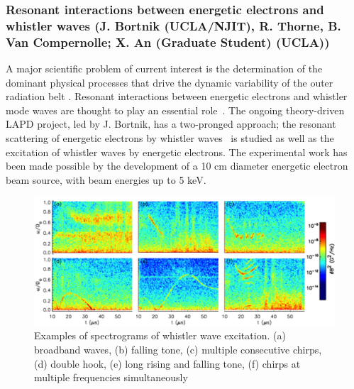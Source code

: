 \documentclass[11pt]{article}
\renewcommand{\cite}{\citep}
\begin{document}
\subsubsection{Resonant interactions between energetic electrons and whistler
waves (J. Bortnik (UCLA/NJIT), R. Thorne, B. Van Compernolle; X. An (Graduate
Student) (UCLA))}

A major scientific problem of current interest is the determination of
the dominant physical processes that drive the dynamic variability of
the outer radiation belt \cite{thorne:2010, reeves:2013}. Resonant interactions between
energetic electrons and whistler mode waves are thought to play an
essential role~\cite{horne:2005, thorne:2013}. The ongoing theory-driven
LAPD project, led by J. Bortnik, has a two-pronged approach; the
resonant scattering of energetic electrons by whistler waves~\cite{vancompernolle:2014} is studied as well as the excitation of
whistler waves by energetic electrons. The experimental work has been
made possible by the development of a 10 cm diameter energetic electron
beam source, with beam energies up to 5 keV.

\begin{figure}[!htbp]
\centerline{\includegraphics[width=5.6truein]{bortnik1}}
\caption{Examples of spectrograms of whistler wave excitation. (a)
  broadband waves, (b) falling tone, (c) multiple consecutive chirps,
  (d) double hook, (e) long rising and falling tone, (f) chirps at
  multiple frequencies simultaneously}\label{bortnik1}
\end{figure}
\end{document}
